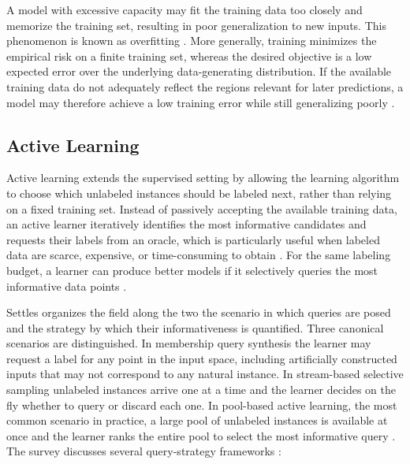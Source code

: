A model with excessive capacity may fit the training data too closely and memorize the training set, resulting in poor generalization to new inputs. This phenomenon is known as overfitting \cite{Goodfellow-et-al-2016}. More generally, training minimizes the empirical risk on a finite training set, whereas the desired objective is a low expected error over the underlying data-generating distribution. If the available training data do not adequately reflect the regions relevant for later predictions, a model may therefore achieve a low training error while still generalizing poorly \cite{Goodfellow-et-al-2016}.

\subsection{Active Learning}
Active learning extends the supervised setting by allowing the learning algorithm to choose which unlabeled instances should be labeled next, rather than relying on a fixed training set. Instead of passively accepting the available training data, an active learner iteratively identifies the most informative candidates and requests their labels from an oracle, which is particularly useful when labeled data are scarce, expensive, or time-consuming to obtain \cite{settles2009active}. For the same labeling budget, a learner can produce better models if it selectively queries the most informative data points \cite{settles2009active}.

Settles \cite{settles2009active} organizes the field along the two the scenario in which queries are posed and the strategy by which their informativeness is quantified. Three canonical scenarios are distinguished. In membership query synthesis the learner may request a label for any point in the input space, including artificially constructed inputs that may not correspond to any natural instance. In stream-based selective sampling unlabeled instances arrive one at a time and the learner decides on the fly whether to query or discard each one. In pool-based active learning, the most common scenario in practice, a large pool of unlabeled instances is available at once and the learner ranks the entire pool to select the most informative query \cite{settles2009active}. The survey discusses several query-strategy frameworks \cite{settles2009active}:

